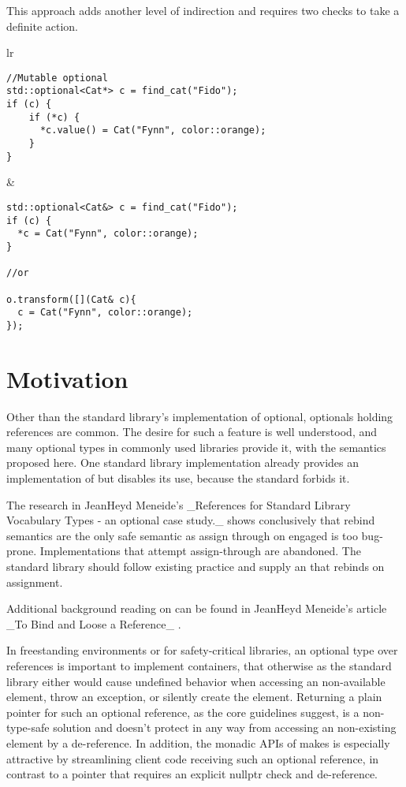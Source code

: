 \documentclass[a4paper,10pt,oneside,openany,final,article]{memoir}
\begin{document}
This approach adds another level of indirection and requires two checks to take a definite action.

  \begin{tabular}{ lr }
  \begin{minipage}[t]{0.45\columnwidth}
    \begin{verbatim}
//Mutable optional
std::optional<Cat*> c = find_cat("Fido");
if (c) {
    if (*c) {
      *c.value() = Cat("Fynn", color::orange);
    }
}

    \end{verbatim}
  \end{minipage}
  &
    \begin{minipage}[t]{0.45\columnwidth}
      \begin{verbatim}
std::optional<Cat&> c = find_cat("Fido");
if (c) {
  *c = Cat("Fynn", color::orange);
}

//or

o.transform([](Cat& c){
  c = Cat("Fynn", color::orange);
});
        \end{verbatim}
      \end{minipage}
\end{tabular}

\chapter{Motivation}
Other than the standard library's implementation of optional, optionals holding references are common. The desire for such a feature is well understood, and many optional types in commonly used libraries provide it, with the semantics proposed here.
One standard library implementation already provides an implementation of  but disables its use, because the standard forbids it.

The research in JeanHeyd Meneide's _References for Standard Library Vocabulary Types - an optional case study._ \cite{P1683R0} shows conclusively that rebind semantics are the only safe semantic as assign through on engaged is too bug-prone. Implementations that attempt assign-through are abandoned. The standard library should follow existing practice and supply an  that rebinds on assignment.

Additional background reading on  can be found in JeanHeyd Meneide's article _To Bind and Loose a Reference_ \cite{REFBIND}.

In freestanding environments or for safety-critical libraries, an optional type over references is important to implement containers, that otherwise as the standard library either would cause undefined behavior when accessing an non-available element, throw an exception, or silently create the element. Returning a plain pointer for such an optional reference, as the core guidelines suggest, is a non-type-safe solution and doesn't protect in any way from accessing an non-existing element by a  de-reference. In addition, the monadic APIs of  makes is especially attractive by streamlining client code receiving such an optional reference, in contrast to a pointer that requires an explicit nullptr check and de-reference.
\end{document}
